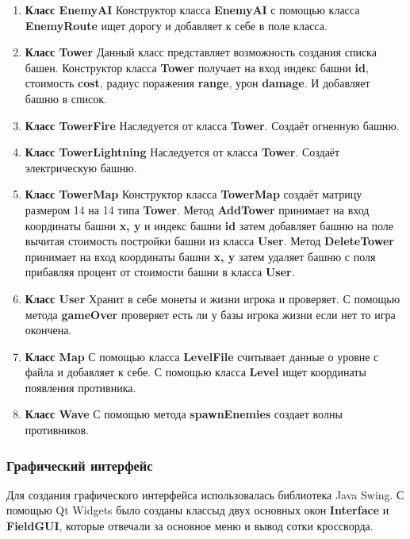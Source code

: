 \begin{enumerate}
	\item \textbf{Класс EnemyAI} 
	Конструктор класса \textbf{EnemyAI} с помощью класса \textbf{EnemyRoute} ищет дорогу и добавляет к себе в поле класса.
	
	\item \textbf{Класс Tower} 
	Данный класс представляет возможность создания списка башен. Конструктор класса \textbf{Tower} получает на вход индекс башни \textbf{id}, стоимость \textbf{cost}, радиус поражения \textbf{range}, урон \textbf{damage}. И добавляет башню в список.
	
	\item \textbf{Класс TowerFire}
	Наследуется от класса \textbf{Tower}. Создаёт огненную башню.
	
	\item \textbf{Класс TowerLightning}
	Наследуется от класса \textbf{Tower}. Создаёт электрическую башню.
	
	\item \textbf{Класс TowerMap}
	Конструктор класса \textbf{TowerMap} создаёт матрицу размером 14 на 14 типа \textbf{Tower}. Метод \textbf{AddTower} принимает на вход координаты башни \textbf{x, y} и индекс башни \textbf{id} затем добавляет башню на поле вычитая стоимость постройки башни из класса \textbf{User}. Метод \textbf{DeleteTower} принимает на вход координаты башни \textbf{x, y} затем удаляет башню с поля прибавляя процент от стоимости башни в класса \textbf{User}.
	
	\item \textbf{Класс User}
	Хранит в себе монеты и жизни игрока и проверяет. С помощью метода \textbf{gameOver} проверяет есть ли у базы игрока жизни если нет то игра окончена. 
	
	\item \textbf{Класс Map}
	С помощью класса \textbf{LevelFile} считывает данные о уровне с файла и добавляет к себе. С помощью класса \textbf{Level} ищет координаты появления противника.
	
	\item \textbf{Класс Wave}
	С помощью метода \textbf{spawnEnemies} создает волны противников.
	
	\end{enumerate}
	
\subsubsection{Графический интерфейс}

Для создания графического интерфейса использовалась библиотека Java Swing. 
С помощью Qt Widgets было созданы классыд двух основных окон \textbf{Interface} и \textbf{FieldGUI}, которые отвечали за основное меню и вывод сотки кроссворда. 

